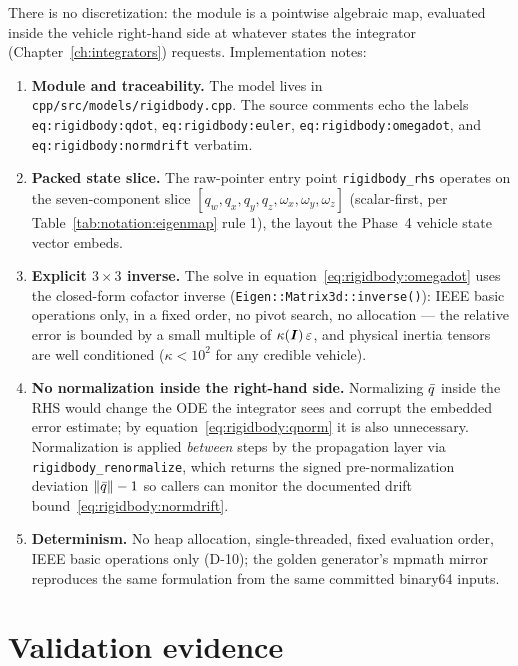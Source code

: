 There is no discretization: the module is a pointwise algebraic map,
evaluated inside the vehicle right-hand side at whatever states the
integrator (Chapter~\ref{ch:integrators}) requests. Implementation notes:
\begin{enumerate}
  \item \textbf{Module and traceability.} The model lives in
    \texttt{cpp/src/models/rigidbody.cpp}. The source comments echo the
    labels \texttt{eq:rigidbody:qdot}, \texttt{eq:rigidbody:euler},
    \texttt{eq:rigidbody:omegadot}, and \texttt{eq:rigidbody:normdrift}
    verbatim.
  \item \textbf{Packed state slice.} The raw-pointer entry point
    \texttt{rigidbody\_rhs} operates on the seven-component slice
    $[q_w, q_x, q_y, q_z, \omega_x, \omega_y, \omega_z]$ (scalar-first,
    per Table~\ref{tab:notation:eigenmap} rule 1), the layout the Phase~4
    vehicle state vector embeds.
  \item \textbf{Explicit $3 \times 3$ inverse.} The solve in
    equation~\eqref{eq:rigidbody:omegadot} uses the closed-form cofactor
    inverse (\texttt{Eigen::Matrix3d::inverse()}): IEEE basic operations
    only, in a fixed order, no pivot search, no allocation --- the
    relative error is bounded by a small multiple of
    $\kappa(\bm{I})\,\varepsilon$, and physical inertia tensors are
    well conditioned ($\kappa < 10^2$ for any credible vehicle).
  \item \textbf{No normalization inside the right-hand side.} Normalizing
    $\bar{q}$ inside the RHS would change the ODE the integrator sees and
    corrupt the embedded error estimate; by
    equation~\eqref{eq:rigidbody:qnorm} it is also unnecessary.
    Normalization is applied \emph{between} steps by the propagation
    layer via \texttt{rigidbody\_renormalize}, which returns the signed
    pre-normalization deviation $\left\lVert \bar{q} \right\rVert - 1$ so callers can
    monitor the documented drift bound~\eqref{eq:rigidbody:normdrift}.
  \item \textbf{Determinism.} No heap allocation, single-threaded, fixed
    evaluation order, IEEE basic operations only (D-10); the golden
    generator's mpmath mirror reproduces the same formulation from the
    same committed binary64 inputs.
\end{enumerate}

\section{Validation evidence}
\label{sec:rigidbody:validation}

